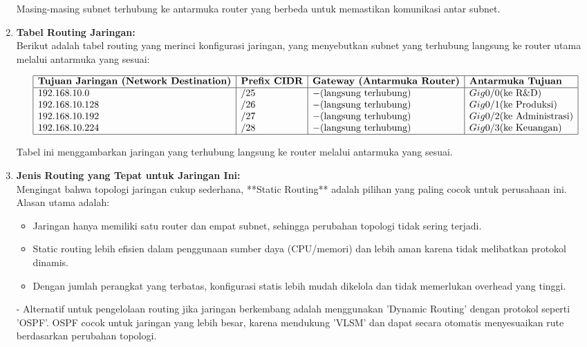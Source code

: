 \begin{enumerate}
    Masing-masing subnet terhubung ke antarmuka router yang berbeda untuk memastikan komunikasi antar subnet.

    \item \textbf{Tabel Routing Jaringan:} \\
    Berikut adalah tabel routing yang merinci konfigurasi jaringan, yang menyebutkan subnet yang terhubung langsung ke router utama melalui antarmuka yang sesuai:
    
    \[
    \begin{array}{|l|l|l|l|}
    \hline
    \textbf{Tujuan Jaringan (Network Destination)} & \textbf{Prefix CIDR} & \textbf{Gateway (Antarmuka Router)} & \textbf{Antarmuka Tujuan} \\
    \hline
    192.168.10.0 & /25 & - (\text{langsung terhubung}) & Gig0/0 (\text{ke R\&D}) \\
    192.168.10.128 & /26 & - (\text{langsung terhubung}) & Gig0/1 (\text{ke Produksi}) \\
    192.168.10.192 & /27 & - (\text{langsung terhubung}) & Gig0/2 (\text{ke Administrasi}) \\
    192.168.10.224 & /28 & - (\text{langsung terhubung}) & Gig0/3 (\text{ke Keuangan}) \\
    \hline
    \end{array}
    \]
    
    Tabel ini menggambarkan jaringan yang terhubung langsung ke router melalui antarmuka yang sesuai.

    \item \textbf{Jenis Routing yang Tepat untuk Jaringan Ini:} \\
    Mengingat bahwa topologi jaringan cukup sederhana, **Static Routing** adalah pilihan yang paling cocok untuk perusahaan ini. Alasan utama adalah:
    \begin{itemize}
        \item Jaringan hanya memiliki satu router dan empat subnet, sehingga perubahan topologi tidak sering terjadi.
        \item Static routing lebih efisien dalam penggunaan sumber daya (CPU/memori) dan lebih aman karena tidak melibatkan protokol dinamis.
        \item Dengan jumlah perangkat yang terbatas, konfigurasi statis lebih mudah dikelola dan tidak memerlukan overhead yang tinggi.
    \end{itemize}
    
    - Alternatif untuk pengelolaan routing jika jaringan berkembang adalah menggunakan 'Dynamic Routing' dengan protokol seperti 'OSPF'. OSPF cocok untuk jaringan yang lebih besar, karena mendukung 'VLSM' dan dapat secara otomatis menyesuaikan rute berdasarkan perubahan topologi.
\end{enumerate}
